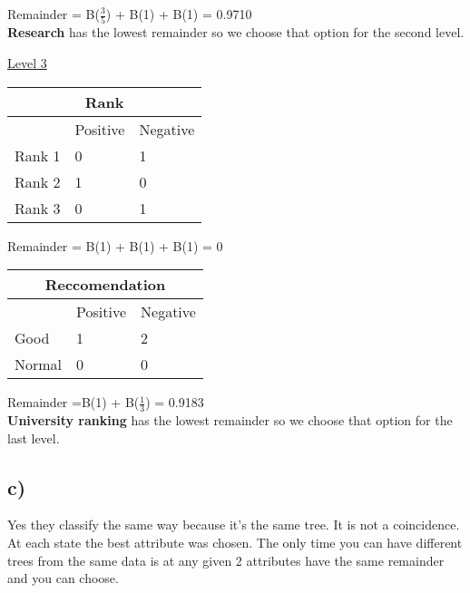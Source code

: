 Remainder = B($\frac{3}{5}$) +  B(1) + B(1) = 0.9710\\

\textbf{Research} has the lowest remainder so we choose that option for the second level.

\underline{Level 3}

\begin{tabular}{ |p{3cm}||p{3cm}|p{3cm}| }
 \hline
 \multicolumn{3}{|c|}{Rank} \\
 \hline
 & Positive & Negative\\
 \hline
 Rank 1 & 0 & 1\\
 Rank 2 &   1 & 0\\
 Rank 3 &   0 & 1\\
 \hline
\end{tabular}

Remainder = B(1) +  B(1) + B(1) = 0\\

\begin{tabular}{ |p{3cm}||p{3cm}|p{3cm}| }
 \hline
 \multicolumn{3}{|c|}{Reccomendation} \\
 \hline
 & Positive & Negative\\
 \hline
 Good & 1 & 2\\
 Normal &   0 & 0\\
 \hline
\end{tabular}

Remainder =B(1) + B($\frac{1}{3}$) = 0.9183\\

\textbf{University ranking} has the lowest remainder so we choose that option for the last level.

\subsection*{c)}
Yes they classify the same way because it's the same tree. It is not a coincidence. At each state the best attribute was chosen. The only time you can have different trees from the same data is at any given 2 attributes have the same remainder and you can choose.